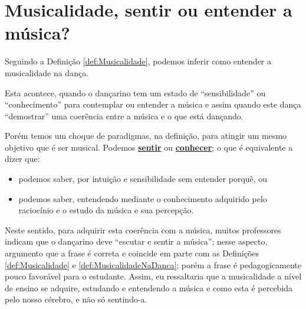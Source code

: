 
\section{Musicalidade, sentir ou entender a música?}
Seguindo a Definição \ref{def:Musicalidade}, podemos inferir como entender a musicalidade na dança.
\begin{definition} 
\label{def:MusicalidadeNaDanca}
Esta acontece, quando o dançarino tem um estado de ``sensibilidade'' ou ``conhecimento'' para contemplar ou entender a música 
e assim quando este dança ``demostrar'' uma coerência entre a música e o que está dançando.
\end{definition}

Porém temos um choque de paradigmas, na definição, para atingir um mesmo objetivo que é ser musical.
Podemos \hyperref[ref:emotionsentimental]{\textbf{sentir}} ou 
\hyperref[subsec:tecnica-sentimentos]{\textbf{conhecer}}; o que é equivalente a dizer que:
\begin{itemize} 
\item podemos saber, por intuição e sensibilidade sem entender porquê, ou
\item podemos saber, entendendo mediante o conhecimento adquirido pelo raciocínio e o estudo da música e sua percepção.
\end{itemize}



Neste sentido, para adquirir esta coerência com a música, 
muitos professores indicam que o dançarino deve ``escutar e sentir a música'';
nesse aspecto, argumento que a frase é correta e coincide em parte com 
as Definições \ref{def:Musicalidade} e \ref{def:MusicalidadeNaDanca};
porém a frase  é pedagogicamente pouco favorável para o estudante.
Assim, eu ressaltaria que a musicalidade a nível de ensino se adquire,
estudando e entendendo a música e como esta é percebida pelo nosso cérebro, e não só sentindo-a.
 
